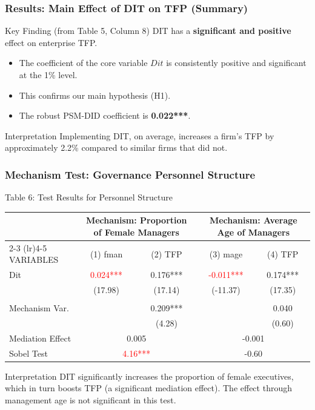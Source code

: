 \documentclass[aspectratio=169]{beamer}
\begin{document}
\begin{frame}
  \frametitle{Results: Main Effect of DIT on TFP (Summary)}
  \begin{block}{Key Finding (from Table 5, Column 8)}
    DIT has a \textbf{significant and positive} effect on enterprise TFP.
  \end{block}
  \begin{itemize}
    \item The coefficient of the core variable $Dit$ is consistently positive and significant at the 1\% level.
    \item This confirms our main hypothesis (H1).
    \item The robust PSM-DID coefficient is \textbf{0.022***}.
  \end{itemize}
  \begin{alertblock}{Interpretation}
    Implementing DIT, on average, increases a firm's TFP by approximately 2.2\% compared to similar firms that did not.
  \end{alertblock}
\end{frame}

\begin{frame}[fragile]
    \frametitle{Mechanism Test: Governance Personnel Structure}
    \begin{block}{Table 6: Test Results for Personnel Structure}
    \centering
    \tiny
    \begin{tabular}{l c c c c}
    \toprule
    & \multicolumn{2}{c}{Mechanism: Proportion of Female Managers} & \multicolumn{2}{c}{Mechanism: Average Age of Managers} \\
    \cmidrule(lr){2-3} \cmidrule(lr){4-5}
    VARIABLES & (1) fman & (2) TFP & (3) mage & (4) TFP \\
    \midrule
    Dit & \textcolor{red}{0.024***} & 0.176*** & \textcolor{red}{-0.011***} & 0.174*** \\
        & (17.98) & (17.14) & (-11.37) & (17.35) \\
    \\
    Mechanism Var. & & 0.209*** & & 0.040 \\
                   & & (4.28)   & & (0.60) \\
    \midrule
    Mediation Effect & \multicolumn{2}{c}{0.005} & \multicolumn{2}{c}{-0.001} \\
    Sobel Test       & \multicolumn{2}{c}{\textcolor{red}{4.16***}} & \multicolumn{2}{c}{-0.60} \\
    \bottomrule
    \end{tabular}
    \end{block}
    \vfill
    \begin{alertblock}{Interpretation}
        DIT significantly increases the proportion of female executives, which in turn boosts TFP (a significant mediation effect). The effect through management age is not significant in this test.
    \end{alertblock}
\end{frame}
\end{document}
